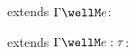 \begin{flushleft}
\medskip
\begin{minipage}[t]{0.5\textwidth}
 extends $\Gamma \wellM e$:
\begin{mathpar}
\end{mathpar}
\end{minipage}%
\begin{minipage}[t]{0.5\textwidth}
 extends $\Gamma \wellM e : \tau$:
\begin{mathpar}
\end{mathpar}
\end{minipage}

\end{flushleft}
